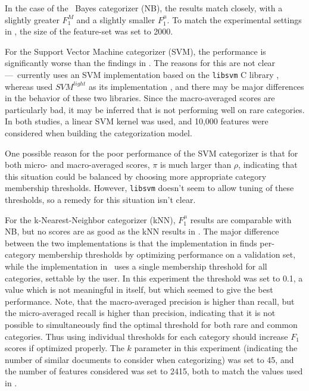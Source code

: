 In the case of the \naive\ Bayes categorizer (NB), the results match
\cite{yang:99} closely, with a slightly greater $F_1^M$ and a slightly
smaller $F_1^\mu$.  To match the experimental
settings in \cite{yang:99}, the size of the feature-set was set to
2000.

For the Support Vector Machine categorizer (SVM), the performance is
significantly worse than the findings in \cite{yang:99}.  The reasons
for this are not clear---\aicat\ currently uses an SVM implementation
based on the \texttt{libsvm} C library \cite{libsvm}, whereas
\cite{yang:99} used $SVM^{light}$ as its
implementation \cite{joachims:99a}, and there may be major differences
in the behavior of these two libraries.  Since the macro-averaged scores are
particularly bad, it may be inferred that \cite{libsvm} is not
performing well on rare categories.  In both studies, a linear SVM
kernel was used, and 10,000 features were considered when building the
categorization model.

One possible reason for the poor performance of the SVM categorizer is
that for both micro- and macro-averaged scores, $\pi$ is much larger
than $\rho$, indicating that this situation could be balanced by
choosing more appropriate category membership thresholds.  However,
\texttt{libsvm} doesn't seem to allow tuning of these thresholds, so a
remedy for this situation isn't clear.

For the k-Nearest-Neighbor categorizer (kNN), $F_1^\mu$ results are comparable
with NB, but no scores are as good as the kNN results in \cite{yang:99}.
The major difference between the two implementations is that the
implementation in \cite{yang:99} finds per-category membership
thresholds by optimizing performance on a validation set, while the
implementation in \aicat\ uses a single membership threshold for all
categories, settable by the user.  In this experiment the threshold
was set to 0.1, a value which is not meaningful in itself, but which
seemed to give the best performance.  Note, that the macro-averaged
precision is higher than recall, but the micro-averaged recall is
higher than precision, indicating that it is not possible to
simultaneously find the optimal threshold for both rare and common
categories.  Thus using individual thresholds for each category should
increase $F_1$ scores if optimized properly.  The $k$ parameter
in this experiment
(indicating the number of similar documents to consider when
categorizing) was set to 45, and the number of features considered was
set to 2415, both to match the values used in \cite{yang:99}.

